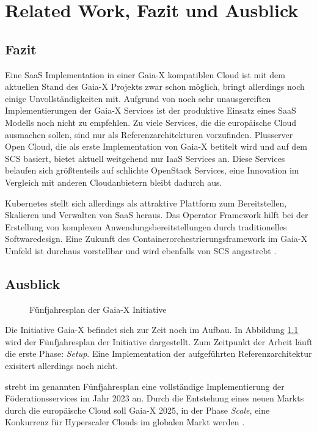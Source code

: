 \chapter{Related Work, Fazit und Ausblick}
\label{chapter:fazit}



\section{Fazit}
\label{sec:fazit_ausblick:fazit}

Eine \ac{SaaS} Implementation in einer Gaia-X kompatiblen Cloud ist mit dem aktuellen Stand des Gaia-X Projekts zwar schon 
möglich, bringt allerdings noch einige Unvollständigkeiten mit.
Aufgrund von noch sehr unausgereiften Implementierungen der Gaia-X Services ist der produktive Einsatz eines \ac{SaaS}
Modells noch nicht zu empfehlen. 
Zu viele Services, die die europäische Cloud ausmachen sollen, sind nur als Referenzarchitekturen vorzufinden.
Plusserver Open Cloud, die als erste Implementation von Gaia-X betitelt wird und auf dem \acf{SCS} basiert, 
bietet aktuell weitgehend nur \ac{IaaS} Services an.
Diese Services belaufen sich größtenteils auf schlichte OpenStack Services, 
eine Innovation im Vergleich mit anderen Cloudanbietern bleibt dadurch aus.

Kubernetes stellt sich allerdings als attraktive Plattform zum Bereitstellen, Skalieren und Verwalten von \acf{SaaS} heraus.
Das Operator Framework hilft bei der Erstellung von komplexen Anwendungsbereitstellungen durch traditionelles Softwaredesign.
Eine Zukunft des Containerorchestrierungsframework im Gaia-X Umfeld ist durchaus vorstellbar und wird ebenfalls von \ac{SCS}
angestrebt \cite{scs}.

\newpage
\section{Ausblick}
\label{sec:fazit_ausblick:ausblick}

\begin{figure}[h]
  \centering
  \caption{Fünfjahresplan der Gaia-X Initiative}
  \label{fig:gaia-x-ausblick}
\end{figure}

Die Initiative Gaia-X befindet sich zur Zeit noch im Aufbau.
In Abbildung \ref{fig:gaia-x-ausblick} wird der Fünfjahresplan der Initiative dargestellt.
Zum Zeitpunkt der Arbeit läuft die erste Phase: \emph{Setup}.
Eine Implementation der aufgeführten Referenzarchitektur exisitert allerdings noch nicht.

\citeauthor{Bonfiglio2021} strebt im genannten Fünfjahresplan eine vollständige Implementierung der Föderationsservices
im Jahr 2023 an.
Durch die Entstehung eines neuen Markts durch die europäische Cloud soll Gaia-X 2025, in der Phase \emph{Scale},
eine Konkurrenz für Hyperscaler Clouds im globalen Markt werden \cite{Bonfiglio2021}.

